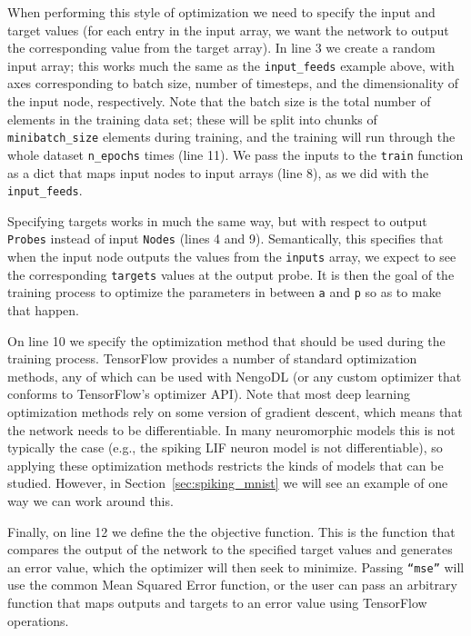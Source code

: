 \documentclass{article}
\begin{document}
\lstset{numbers=left}


When performing this style of optimization we need to specify the input and target values (for each entry in the input array, we want the network to output the corresponding value from the target array).  In line 3 we create a random input array; this works much the same as the \texttt{input\_feeds} example above, with axes corresponding to batch size, number of timesteps, and the dimensionality of the input node, respectively.  Note that the batch size is the total number of elements in the training data set; these will be split into chunks of \texttt{minibatch\_size} elements during training, and the training will run through the whole dataset \texttt{n\_epochs} times (line 11).  We pass the inputs to the \texttt{train} function as a dict that maps input nodes to input arrays (line 8), as we did with the \texttt{input\_feeds}.

Specifying targets works in much the same way, but with respect to output \texttt{Probes} instead of input \texttt{Nodes} (lines 4 and 9).  Semantically, this specifies that when the input node outputs the values from the \texttt{inputs} array, we expect to see the corresponding \texttt{targets} values at the output probe.  It is then the goal of the training process to optimize the parameters in between \texttt{a} and \texttt{p} so as to make that happen.

On line 10 we specify the optimization method that should be used during the training process.  TensorFlow provides a number of standard optimization methods, any of which can be used with NengoDL (or any custom optimizer that conforms to TensorFlow's optimizer API).  Note that most deep learning optimization methods rely on some version of gradient descent, which means that the network needs to be differentiable.  In many neuromorphic models this is not typically the case (e.g., the spiking LIF neuron model is not differentiable), so applying these optimization methods restricts the kinds of models that can be studied.  However, in Section~\ref{sec:spiking_mnist} we will see an example of one way we can work around this.

Finally, on line 12 we define the the objective function.  This is the function that compares the output of the network to the specified target values and generates an error value, which the optimizer will then seek to minimize.  Passing \texttt{``mse''} will use the common Mean Squared Error function, or the user can pass an arbitrary function that maps outputs and targets to an error value using TensorFlow operations.
\end{document}
